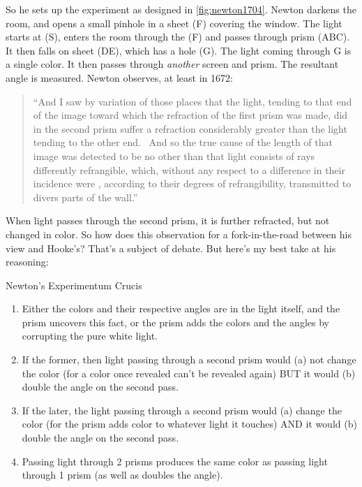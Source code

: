 \begin{refsection}
So he sets up the experiment as designed in \ref{fig:newton1704}. Newton darkens the room, and opens a small pinhole in a sheet (F) covering the window. The light starts at (S), enters the room through the (F) and passes through prism (ABC). It then falls on sheet (DE), which has a hole (G). The light coming through G is a single color. It then passes through \emph{another} screen and prism. The resultant angle is measured. Newton observes, at least in 1672:

\begin{quote}

``And I saw by variation of those places that the light, tending to that end of the image toward which the refraction of the first prism was made, did in the second prism suffer a refraction considerably greater than the light tending to the other end.  And so the true cause of the length of that image was detected to be no other than that light consists of rays differently refrangible, which, without any respect to a difference in their incidence were , according to their degrees of refrangibility, transmitted to divers parts of the wall.''
\end{quote}

When light passes through the second prism, it is further refracted, but not changed in color. So how does this observation for a fork-in-the-road between his view and Hooke's? That's a subject of debate. But here's my best take at his reasoning:

\begin{apatextbox}{Newton's Experimentum Crucis} 

\begin{enumerate}
\item Either the colors and their respective angles are in the light itself, and the prism uncovers this fact, or the prism adds the colors and the angles by corrupting the pure white light.

\item If the former, then light passing through a second prism would (a) not change the color (for a color once revealed can't be revealed again) BUT it would (b) double the angle on the second pass.

\item If the later, the light passing through a second prism would (a) change the color (for the prism adds color to whatever light it touches) AND it would (b) double the angle on the second pass.

\item Passing light through 2 prisms produces the same color as passing light through 1 prism (as well as doubles the angle).


\end{enumerate}
\end{apatextbox}
\end{refsection}
